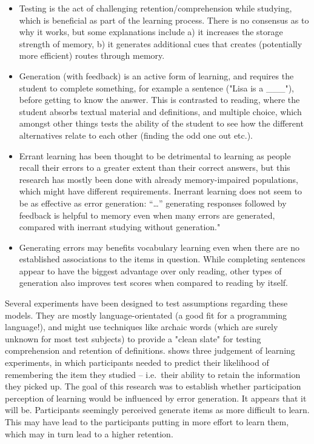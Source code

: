 \begin{itemize}

\item Testing is the act of challenging retention/comprehension while studying,
  which is beneficial as part of the learning process. There is no consensus as
  to why it works, but some explanations include a) it increases the storage
  strength of memory, b) it generates additional cues that creates (potentially
  more efficient) routes through memory.\cite[p.6]{potts2014benefit}

\item Generation (with feedback) is an active form of learning, and requires the
  student to complete something, for example a sentence ("Lisa is a \_\_\_"),
  before getting to know the answer. This is contrasted to reading, where the
  student absorbs textual material and definitions, and multiple choice, which
  amongst other things tests the ability of the student to see how the different
  alternatives relate to each other (finding the odd one out etc.).

\item Errant learning has been thought to be detrimental to learning as people
  recall their errors to a greater extent than their correct
  answers\cite{potts2014benefit}, but this research has mostly been done with
  already memory-impaired populations, which might have different requirements.
  Inerrant learning does not seem to be as effective as error generation: 
  ``\dots'' generating responses followed by feedback is helpful to memory 
  even when many errors are generated, compared with inerrant studying without
  generation."\cite[p.54]{potts2014benefit}

\item Generating errors may benefits vocabulary learning even when there are 
  no established associations to the items in 
  question\cite[p.54]{potts2014benefit}. While completing sentences appear to 
  have the biggest advantage over only reading, other types of generation also 
  improves test scores when compared to reading by 
  itself\cite[p.73]{benassi2014applying}.

\end{itemize}

Several experiments have been designed to test assumptions regarding
these models. They are mostly language-orientated (a good fit for a 
programming language!), and might use techniques like archaic words (which are 
surely unknown for most test subjects) to provide a "clean slate" for testing 
comprehension and retention of definitions. \cite{potts2014benefit} shows 
three judgement of learning experiments, in which participants needed to 
predict their likelihood of remembering the item they studied -- i.e.\ their 
ability to retain the information they picked up. The goal of this research 
was to establish whether participation perception of learning would be 
influenced by error generation. It appears that it will be. Participants 
seemingly perceived generate items as more difficult to learn. This may have 
lead to the participants putting in more effort to learn them, which may in 
turn lead to a higher retention.

